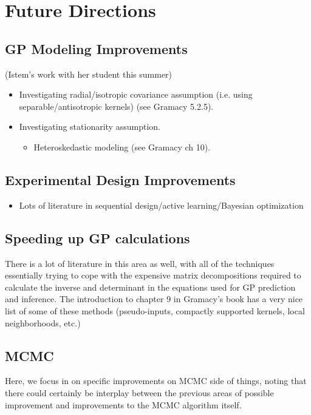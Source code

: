 \documentclass[12pt]{article}
\begin{document}
\section{Future Directions}
\subsection{GP Modeling Improvements} (Istem's work with her student this summer)
\begin{itemize}
\item Investigating radial/isotropic covariance assumption (i.e. using separable/antisotropic kernels) (see Gramacy 5.2.5).
\item Investigating stationarity assumption. 
	\begin{itemize}
	\item Heteroskedastic modeling (see Gramacy ch 10). 
	\end{itemize}
\end{itemize}

\subsection{Experimental Design Improvements}
\begin{itemize}
\item Lots of literature in sequential design/active learning/Bayesian optimization
\end{itemize}

\subsection{Speeding up GP calculations}
There is a lot of literature in this area as well, with all of the techniques essentially trying to cope with the expensive matrix decompositions required 
to calculate the inverse and determinant in the equations used for GP prediction and inference. The introduction to chapter 9 in Gramacy's book has a 
very nice list of some of these methods (pseudo-inputs, compactly supported kernels, local neighborhoods, etc.) 

\subsection{MCMC}
Here, we focus in on specific improvements on MCMC side of things, noting that there could certainly be interplay between the previous areas of possible improvement 
and improvements to the MCMC algorithm itself. 
\end{document}
